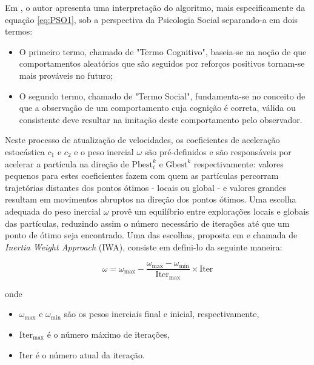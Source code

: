 \documentclass[
	12pt,				%
	openright,			%
	twoside,			%
	a4paper,			%
	english,			%
	french,				%
	spanish,			%
	brazil				%
	]{abntex2}
\begin{document}
Em \cite{kennedy1997particle}, o autor apresenta uma interpretação do algoritmo, mais especificamente da equação \ref{eq:PSO1}, sob a perspectiva da Psicologia Social separando-a em dois termos:

\begin{itemize}
\item O primeiro termo, chamado de "Termo Cognitivo", baseia-se na noção de que comportamentos aleatórios que são seguidos por reforços positivos tornam-se mais prováveis no futuro;
\item O segundo termo, chamado de "Termo Social", fundamenta-se no conceito de que a observação de um comportamento cuja cognição é correta, válida ou consistente deve resultar na imitação deste comportamento pelo observador.
\end{itemize}

Neste processo de atualização de velocidades, os coeficientes de aceleração estocástica $c_1$ e $c_2$ e o peso inercial $\omega$ são pré-definidos e são responsáveis por acelerar a partícula na direção de $\text{Pbest}_i^k$ e $\text{Gbest}^k$ respectivamente: valores pequenos para estes coeficientes fazem com quem as partículas percorram trajetórias distantes dos pontos ótimos - locais ou global - e valores grandes resultam em movimentos abruptos na direção dos pontos ótimos. Uma escolha adequada do peso inercial $\omega$ provê um equilíbrio entre explorações locais e globais das partículas, reduzindo assim o número necessário de iterações até que um ponto de ótimo seja encontrado. Uma das escolhas, proposta em \cite{kennedy2001swarm} e chamada de \textit{Inertia Weight Approach} (IWA), consiste em defini-lo da seguinte maneira:

\begin{equation}
\omega = \omega_{\text{max}} - \frac{\omega_{\text{max}} - \omega_{\text{min}}}{\text{Iter}_{\text{max}}} \times \text{Iter}
\label{eq:pesoinercial}
\end{equation}

onde

\begin{itemize}
\item $\omega_{\text{max}}$ e $\omega_{\text{min}}$ são os pesos inerciais final e inicial, respectivamente, 
\item $\text{Iter}_{\text{max}}$ é o número máximo de iterações,
\item $\text{Iter}$ é o número atual da iteração.
\end{itemize}
\end{document}
